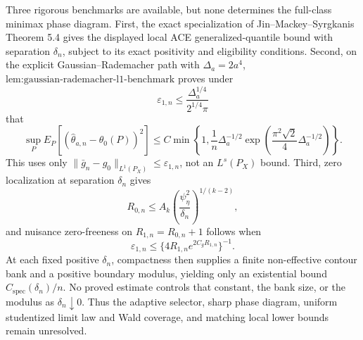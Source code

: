 Three rigorous benchmarks are available, but none determines the full-class minimax phase diagram.  First, the exact specialization of Jin--Mackey--Syrgkanis Theorem 5.4 gives the displayed local ACE generalized-quantile bound with separation \(\delta_n\), subject to its exact positivity and eligibility conditions.  Second, on the explicit Gaussian--Rademacher path with \(\Delta_a=2a^4\), \(\text{lem:gaussian-rademacher-l1-benchmark}\) proves under
\[
 \varepsilon_{1,n}\le\frac{\Delta_a^{1/4}}{2^{1/4}\pi}
\]
that
\[
 \sup_P E_P[(\widehat\theta_{a,n}-\theta_0(P))^2]
 \le C\min\!\left\{1,\frac1n\Delta_a^{-1/2}
 \exp\!\left(\frac{\pi^2\sqrt2}{4}\Delta_a^{-1/2}\right)\right\}.
\]
This uses only \(\|\bar g_n-g_0\|_{L^1(P_X)}\le\varepsilon_{1,n}\), not an \(L^s(P_X)\) bound.  Third, zero localization at separation \(\delta_n\) gives
\[
 R_{0,n}\le A_k\left(\frac{\psi_{\eta}^2}{\delta_n}\right)^{1/(k-2)},
\]
and nuisance zero-freeness on \(R_{1,n}=R_{0,n}+1\) follows when
\[
 \varepsilon_{1,n}\le\{4R_{1,n}e^{2C_gR_{1,n}}\}^{-1}.
\]
At each fixed positive \(\delta_n\), compactness then supplies a finite non-effective contour bank and a positive boundary modulus, yielding only an existential bound \(C_{\mathrm{spec}}(\delta_n)/n\).  No proved estimate controls that constant, the bank size, or the modulus as \(\delta_n\downarrow0\).  Thus the adaptive selector, sharp phase diagram, uniform studentized limit law and Wald coverage, and matching local lower bounds remain unresolved.